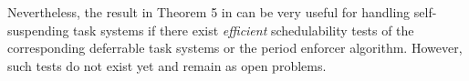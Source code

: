 Nevertheless, the result in Theorem 5 in \cite{Raj:suspension1991} can be very useful for handling self-suspending task systems if there exist \emph{efficient} schedulability tests of the corresponding deferrable task systems or the period enforcer algorithm. However, such tests do not exist yet and remain as open problems.



